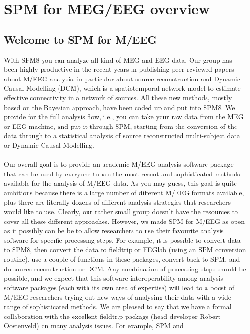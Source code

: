 \chapter{SPM for MEG/EEG overview \label{Chap:eeg:overview}}

\section{Welcome to SPM for M/EEG}
With SPM8 you can analyze all kind of MEG
and EEG data. Our group has been highly productive in the recent years
in publishing peer-reviewed papers about M/EEG analysis, in particular
about source reconstruction and Dynamic Causal Modelling (DCM), which
is a spatiotemporal network model to estimate effective connectivity
in a network of sources. All these new methods, mostly based on the
Bayesian approach, have been coded up and put into SPM8. We
provide for the full analysis flow, i.e., you can take your raw data
from the MEG or EEG machine, and put it through SPM, starting from the
conversion of the data through to a statistical analysis of source
reconstructed multi-subject data or Dynamic Causal Modelling.
\\
\\
Our overall goal is to provide an academic M/EEG analysis software
package that can be used by everyone to use the most recent and
sophisticated methods available for the analysis of M/EEG data. As you
may guess, this goal is quite ambitious because there is a large
number of different M/EEG formats available, plus there are literally
dozens of different analysis strategies that researchers would like to
use. Clearly, our rather small group doesn't have the resources
to cover all these different approaches. However, we made SPM for
M/EEG as open as it possibly can be be to allow researchers to use
their favourite analysis software for specific processing steps. For
example, it is possible to convert data to SPM8, then convert the data
to fieldtrip or EEGlab (using an SPM conversion routine), use a couple
of functions in these packages, convert back to SPM, and do source
reconstruction or DCM. Any combination of processing steps should be
possible, and we expect that this 
software-interoperability among analysis software packages (each with
its own area of expertise) will lead to a boost of M/EEG researchers
trying out new ways of analysing their data with a wide range of
sophisticated methods. We are pleased to say that we have a formal
collaboration with the excellent fieldtrip package (head developer
Robert Oostenveld) on many analysis issues. For example, SPM and
